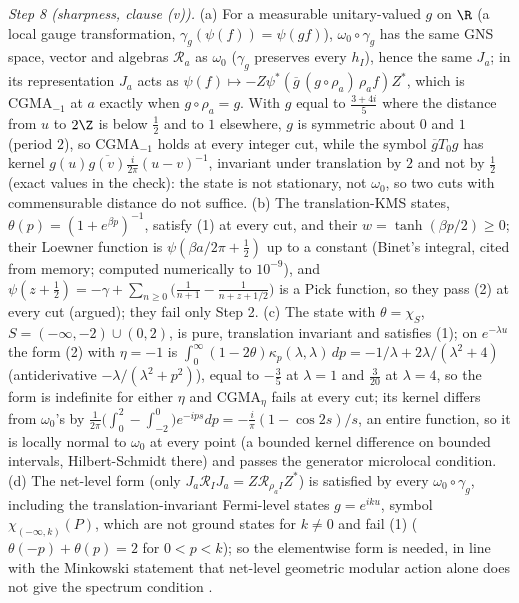 \emph{Step 8 (sharpness, clause (v)).} (a) For a measurable unitary-valued $g$ on $\R$ (a local gauge transformation, $\gamma_{g}(\psi(f)) = \psi(gf)$), $\omega_{0}\circ\gamma_{g}$ has the same GNS space, vector and algebras $\mathcal{R}_{a}$ as $\omega_{0}$ ($\gamma_{g}$ preserves every $h_{I}$), hence the same $J_{a}$; in its representation $J_{a}$ acts as $\psi(f) \mapsto -Z\psi^{*}(\overline{g}\,(g\circ\rho_{a})\,\rho_{a}f)Z^{*}$, which is CGMA$_{-1}$ at $a$ exactly when $g\circ\rho_{a} = g$. With $g$ equal to $\tfrac{3 + 4i}{5}$ where the distance from $u$ to $2\Z$ is below $\tfrac12$ and to $1$ elsewhere, $g$ is symmetric about $0$ and $1$ (period $2$), so CGMA$_{-1}$ holds at every integer cut, while the symbol $\overline{g}T_{0}g$ has kernel $g(u)\overline{g(v)}\tfrac{i}{2\pi}(u - v)^{-1}$, invariant under translation by $2$ and not by $\tfrac12$ (exact values in the check): the state is not stationary, not $\omega_{0}$, so two cuts with commensurable distance do not suffice. (b) The translation-KMS states, $\theta(p) = (1 + e^{\beta p})^{-1}$, satisfy (1) at every cut, and their $w = \tanh(\beta p/2) \ge 0$; their Loewner function is $\psi(\beta a/2\pi + \tfrac12)$ up to a constant (Binet's integral, cited from memory; computed numerically to $10^{-9}$), and $\psi(z + \tfrac12) = -\gamma + \sum_{n \ge 0}\big(\tfrac{1}{n + 1} - \tfrac{1}{n + z + 1/2}\big)$ is a Pick function, so they pass (2) at every cut (argued); they fail only Step 2. (c) The state with $\theta = \chi_{S}$, $S = (-\infty, -2)\cup(0, 2)$, is pure, translation invariant and satisfies (1); on $e^{-\lambda u}$ the form (2) with $\eta = -1$ is $\int_{0}^{\infty}(1 - 2\theta)\kappa_{p}(\lambda, \lambda)\,dp = -1/\lambda + 2\lambda/(\lambda^{2} + 4)$ (antiderivative $-\lambda/(\lambda^{2} + p^{2})$), equal to $-\tfrac35$ at $\lambda = 1$ and $\tfrac{3}{20}$ at $\lambda = 4$, so the form is indefinite for either $\eta$ and CGMA$_{\eta}$ fails at every cut; its kernel differs from $\omega_{0}$'s by $\tfrac{1}{2\pi}\big(\int_{0}^{2} - \int_{-2}^{0}\big)e^{-ips}dp = -\tfrac{i}{\pi}(1 - \cos 2s)/s$, an entire function, so it is locally normal to $\omega_{0}$ at every point (a bounded kernel difference on bounded intervals, Hilbert-Schmidt there) and passes the generator microlocal condition. (d) The net-level form (only $J_{a}\mathcal{R}_{I}J_{a} = Z\mathcal{R}_{\rho_{a}I}Z^{*}$) is satisfied by every $\omega_{0}\circ\gamma_{g}$, including the translation-invariant Fermi-level states $g = e^{iku}$, symbol $\chi_{(-\infty, k)}(P)$, which are not ground states for $k \ne 0$ and fail (1) ($\theta(-p) + \theta(p) = 2$ for $0 < p < k$); so the elementwise form is needed, in line with the Minkowski statement that net-level geometric modular action alone does not give the spectrum condition \cite{BFS1999}.
